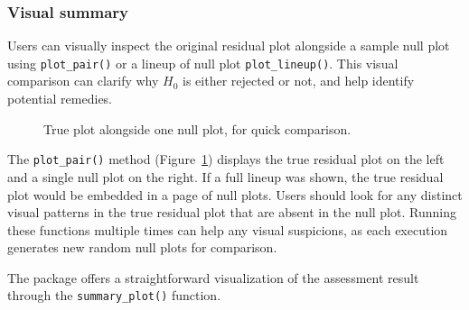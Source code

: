\documentclass[
doublespace,
  times]{anzsauth}
\newenvironment{Shaded}{\begin{snugshade}}{\end{snugshade}}
\newcommand{\FunctionTok}[1]{\textcolor[rgb]{0.28,0.35,0.67}{#1}}
\newcommand{\NormalTok}[1]{\textcolor[rgb]{0.00,0.23,0.31}{#1}}
\newcommand{\SpecialCharTok}[1]{\textcolor[rgb]{0.37,0.37,0.37}{#1}}
\begin{document}
\subsubsection{Visual summary}\label{sec-autovi-visual}

Users can visually inspect the original residual plot alongside a sample
null plot using \texttt{plot\_pair()} or a lineup of null plot
\texttt{plot\_lineup()}. This visual comparison can clarify why \(H_0\)
is either rejected or not, and help identify potential remedies.

\begin{Shaded}
\end{Shaded}

\begin{figure}[H]


\caption{\label{fig-plot-pair}True plot alongside one null plot, for
quick comparison.}

\end{figure}%

The \texttt{plot\_pair()} method (Figure~\ref{fig-plot-pair}) displays
the true residual plot on the left and a single null plot on the right.
If a full lineup was shown, the true residual plot would be embedded in
a page of null plots. Users should look for any distinct visual patterns
in the true residual plot that are absent in the null plot. Running
these functions multiple times can help any visual suspicions, as each
execution generates new random null plots for comparison.

The package offers a straightforward visualization of the assessment
result through the \texttt{summary\_plot()} function.
\end{document}
